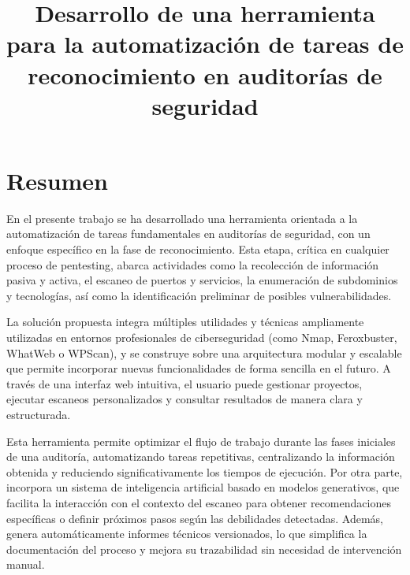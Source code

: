 \documentclass[minitoc, hidelinks, headlogo, framedcover]{tfeEPCC}
\title{Desarrollo de una herramienta para la automatización de tareas de reconocimiento en auditorías de seguridad}
\begin{document}
\sloppy 
\pagebreak 


\pagestyle{empty}




\chapter*{Resumen}
En el presente trabajo se ha desarrollado una herramienta orientada a la automatización de tareas fundamentales en auditorías de seguridad, con un enfoque específico en la fase de reconocimiento. Esta etapa, crítica en cualquier proceso de pentesting, abarca actividades como la recolección de información pasiva y activa, el escaneo de puertos y servicios, la enumeración de subdominios y tecnologías, así como la identificación preliminar de posibles vulnerabilidades.

La solución propuesta integra múltiples utilidades y técnicas ampliamente utilizadas en entornos profesionales de ciberseguridad (como Nmap, Feroxbuster, WhatWeb o WPScan), y se construye sobre una arquitectura modular y escalable que permite incorporar nuevas funcionalidades de forma sencilla en el futuro. A través de una interfaz web intuitiva, el usuario puede gestionar proyectos, ejecutar escaneos personalizados y consultar resultados de manera clara y estructurada.

Esta herramienta permite optimizar el flujo de trabajo durante las fases iniciales de una auditoría, automatizando tareas repetitivas, centralizando la información obtenida y reduciendo significativamente los tiempos de ejecución. Por otra parte, incorpora un sistema de inteligencia artificial basado en modelos generativos, que facilita la interacción con el contexto del escaneo para obtener recomendaciones específicas o definir próximos pasos según las debilidades detectadas. Además, genera automáticamente informes técnicos versionados, lo que simplifica la documentación del proceso y mejora su trazabilidad sin necesidad de intervención manual.
\end{document}

